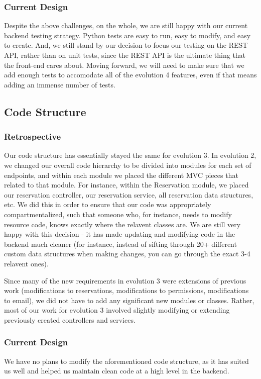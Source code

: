\documentclass[12pt]{article}
\begin{document}
\subsubsection{Current Design}
Despite the above challenges, on the whole, we are still happy with our current backend testing strategy. Python tests are easy to run, easy to modify, and easy to create. And, we still stand by our decision to focus our testing on the REST API, rather than on unit tests, since the REST API is the ultimate thing that the front-end cares about. Moving forward, we will need to make sure that we add enough tests to accomodate all of the evolution 4 features, even if that means adding an immense number of tests. 

\subsection{Code Structure}
\subsubsection{Retrospective}
Our code structure has essentially stayed the same for evolution 3. In evolution 2, we changed our overall code hierarchy to be divided into modules for each set of endpoints, and within each module we placed the different MVC pieces that related to that module. For instance, within the Reservation module, we placed our reservation controller, our reservation service, all reservation data structures, etc. We did this in order to ensure that our code was appropriately compartmentalized, such that someone who, for instance, needs to modify resource code, knows exactly where the relavent classes are. We are still very happy with this decision - it has made updating and modifying code in the backend much cleaner (for instance, instead of sifting through 20+ different custom data structures when making changes, you can go through the exact 3-4 relavent ones). 

Since many of the new requirements in evolution 3 were extensions of previous work (modifications to reservations, modifications to permissions, modifications to email), we did not have to add any significant new modules or classes. Rather, most of our work for evolution 3 involved slightly modifying or extending previously created controllers and services. 

\subsubsection{Current Design}
We have no plans to modify the aforementioned code structure, as it has suited us well and helped us maintain clean code at a high level in the backend. 
\end{document}

